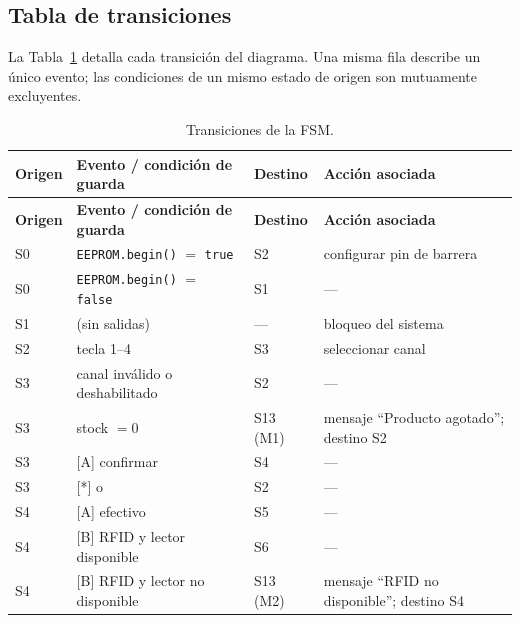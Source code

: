\documentclass[12pt,a4paper]{article}
\begin{document}
\clearpage
\pdfpagewidth=21cm
\pdfpageheight=29.7cm
\paperwidth=21cm
\paperheight=29.7cm
\vsize=24.7cm
\hsize=15.4cm
\restoregeometry

\subsection{Tabla de transiciones}

La Tabla~\ref{tab:transiciones} detalla cada transici\'on del diagrama. Una
misma fila describe un \'unico evento; las condiciones de un mismo estado de
origen son mutuamente excluyentes.

{\small
\setlength{\tabcolsep}{4pt}
\renewcommand{\arraystretch}{1.15}
\begin{longtable}{@{}p{1.0cm}p{5.5cm}p{1.9cm}p{5.5cm}@{}}
\caption{Transiciones de la FSM.}\label{tab:transiciones}\\
\hline
\textbf{Origen} & \textbf{Evento / condici\'on de guarda} & \textbf{Destino} & \textbf{Acci\'on asociada}\\ \hline
\endfirsthead
\hline
\textbf{Origen} & \textbf{Evento / condici\'on de guarda} & \textbf{Destino} & \textbf{Acci\'on asociada}\\ \hline
\endhead
\hline
\endfoot
S0  & \texttt{EEPROM.begin()} $=$ \texttt{true}  & S2  & configurar pin de barrera\\
S0  & \texttt{EEPROM.begin()} $=$ \texttt{false} & S1  & ---\\
S1  & (sin salidas)                               & ---  & bloqueo del sistema\\ \hline
S2  & tecla 1--4                                  & S3  & seleccionar canal\\ \hline
S3  & canal inv\'alido o deshabilitado            & S2  & ---\\
S3  & stock $=0$                                  & S13 (M1) & mensaje ``Producto agotado''; destino S2\\
S3  & {[A]} confirmar                             & S4  & ---\\
S3  & {[*]} o \tin{}                              & S2  & ---\\ \hline
S4  & {[A]} efectivo                              & S5  & ---\\
S4  & {[B]} RFID y lector disponible              & S6  & ---\\
S4  & {[B]} RFID y lector no disponible           & S13 (M2) & mensaje ``RFID no disponible''; destino S4\\

\end{longtable}}
\end{document}
